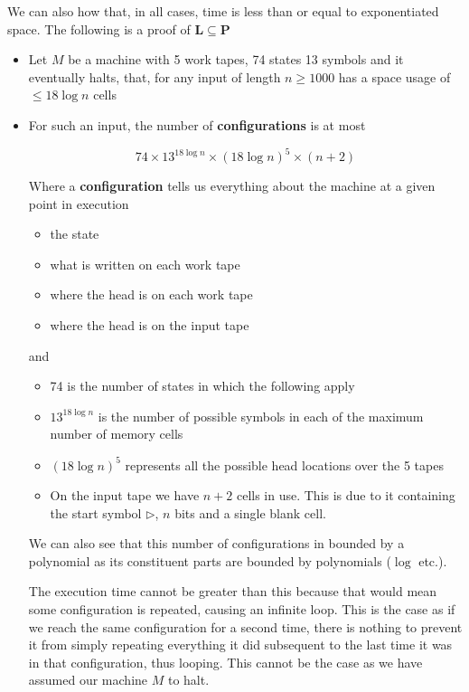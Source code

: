 \documentclass{article}
\begin{document}
  We can also how that, in all cases, time is less than or equal to exponentiated space.
  The following is a proof of $\mathbf{L} \subseteq \mathbf{P} $

  \begin{itemize}
    \item Let $M$ be a machine with 5 work tapes, 74 states 13 symbols and it eventually halts, that, for any input of length $n\geq 1000$ has a space usage of $\leq 18\log n$ cells

    \item For such an input, the number of \textbf{configurations} is at most

          \[
          74 \times 13^{18\log n} \times (18\log n)^{5}\times (n+2)
          \]

          Where a \textbf{configuration} tells us everything about the machine at a given point in execution
          \begin{itemize}
            \item the state
            \item what is written on each work tape
            \item where the head is on each work tape
            \item where the head is on the input tape
          \end{itemize}

          and

          \begin{itemize}
            \item 74 is the number of states in which the following apply
            \item $13^{18\log n}$ is the number of possible symbols in each of the maximum number of memory cells
            \item $(18\log n)^{5}$ represents all the possible head locations over the 5 tapes
            \item On the input tape we have $n+2$ cells in use. This is due to it containing the start symbol $\rhd$, $n$ bits and a single blank cell.
          \end{itemize}

          We can also see that this number of configurations in bounded by a polynomial as its constituent parts are bounded by polynomials ($\log$ etc.).

          The execution time cannot be greater than this because that would mean some configuration is repeated, causing an infinite loop. This is the case as if we reach the same configuration for a second time, there is nothing to prevent it from simply repeating everything it did subsequent to the last time it was in that configuration, thus looping. This cannot be the case as we have assumed our machine $M$ to halt.

  \end{itemize}
\end{document}
